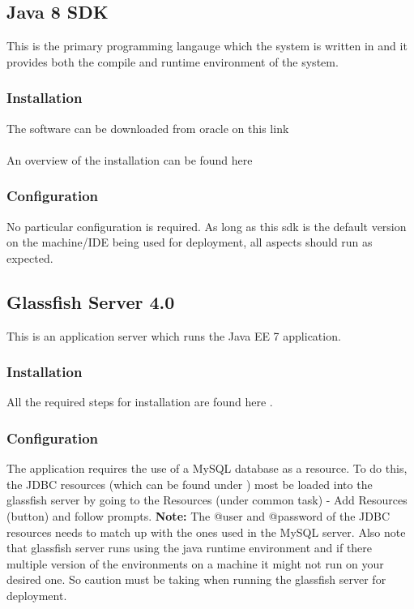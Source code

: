 \documentclass[12pt]{article}
\begin{document}
\subsection{Java 8 SDK}
This is the primary programming langauge which the system is written in and it provides both the compile and runtime environment of the system.
\subsubsection{Installation}
The software can be downloaded from oracle on this link \textbf{} \\
\\
An overview of the installation can be found here \textbf{}
\subsubsection{Configuration}
No particular configuration is required. As long as this sdk is the default version on the machine/IDE being used for deployment, all aspects should run as expected.
\subsection{Glassfish Server 4.0}
This is an application server which runs the Java EE 7 application.
\subsubsection{Installation}
All the required steps for installation are found here \textbf{}.
\subsubsection{Configuration}
The application requires the use of a MySQL database as a resource. To do this, the JDBC resources (which can be found under \textbf{}) most be loaded into the glassfish server by going to the Resources (under common task) - Add Resources (button) and follow prompts.
\textbf{Note:} The @user and @password of the JDBC resources needs to match up with the ones used in the MySQL server. Also note that glassfish server runs using the java runtime environment and if there multiple version of the environments on a machine it might not run on your desired one. So caution must be taking when running the glassfish server for deployment.\\
\end{document}
